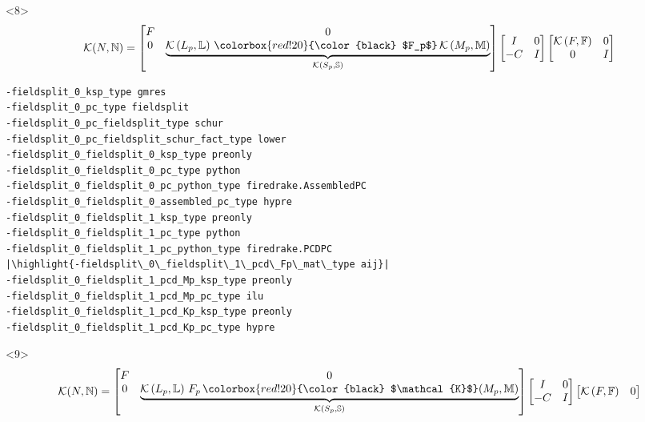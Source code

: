 \documentclass[presentation]{beamer}
\newcommand{\KSP}[2]{\ensuremath{\mathcal{K}\left(#1, \mathbb{#2}\right)}}
\newcommand{\ksp}[1]{\KSP{#1}{#1}}
\newcommand{\highlight}[1]{\colorbox{red!20}{\color{black} #1}}
\begin{document}
\begin{frame}[fragile]
  \begin{onlyenv}<8>
    \color{gray}
    \begin{equation*}
      \mathcal{K}(N, \mathbb{N}) = \begin{bmatrix}
        F & 0 \\
        0 & \underbrace{\KSP{L_p}{L}\,\highlight{$F_p$} \, \KSP{M_p}{M}}_{\KSP{S_p}{S}}
      \end{bmatrix}
      \begin{bmatrix}
        I & 0\\
        -C & I
      \end{bmatrix}
      \begin{bmatrix}
        \ksp{F} & 0 \\
        0 & I
      \end{bmatrix}
    \end{equation*}
\begin{verbatim}
-fieldsplit_0_ksp_type gmres
-fieldsplit_0_pc_type fieldsplit
-fieldsplit_0_pc_fieldsplit_type schur
-fieldsplit_0_pc_fieldsplit_schur_fact_type lower
-fieldsplit_0_fieldsplit_0_ksp_type preonly
-fieldsplit_0_fieldsplit_0_pc_type python
-fieldsplit_0_fieldsplit_0_pc_python_type firedrake.AssembledPC
-fieldsplit_0_fieldsplit_0_assembled_pc_type hypre
-fieldsplit_0_fieldsplit_1_ksp_type preonly
-fieldsplit_0_fieldsplit_1_pc_type python
-fieldsplit_0_fieldsplit_1_pc_python_type firedrake.PCDPC
|\highlight{-fieldsplit\_0\_fieldsplit\_1\_pcd\_Fp\_mat\_type aij}|
-fieldsplit_0_fieldsplit_1_pcd_Mp_ksp_type preonly
-fieldsplit_0_fieldsplit_1_pcd_Mp_pc_type ilu
-fieldsplit_0_fieldsplit_1_pcd_Kp_ksp_type preonly
-fieldsplit_0_fieldsplit_1_pcd_Kp_pc_type hypre
\end{verbatim}
  \end{onlyenv}
  \begin{onlyenv}<9>
    \color{gray}
    \begin{equation*}
      \mathcal{K}(N, \mathbb{N}) = \begin{bmatrix}
        F & 0 \\
        0 & \underbrace{\KSP{L_p}{L}\,F_p \, \highlight{$\mathcal{K}$}(M_p,
        \mathbb{M})}_{\KSP{S_p}{S}}
      \end{bmatrix}
      \begin{bmatrix}
        I & 0\\
        -C & I
      \end{bmatrix}
      \begin{bmatrix}
        \ksp{F} & 0 \\

\end{bmatrix}
\end{equation*}
\end{onlyenv}
\end{frame}
\end{document}
